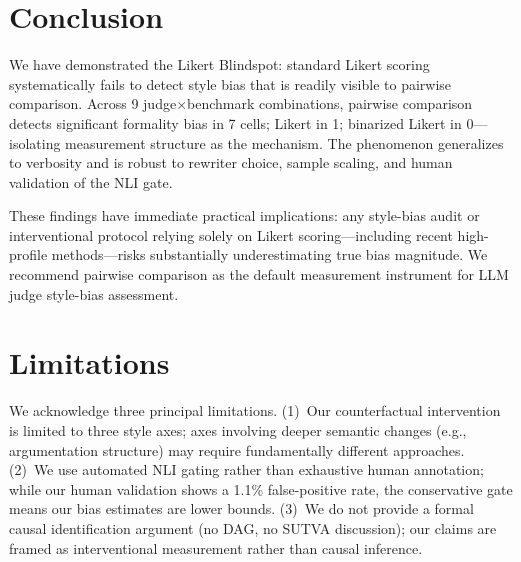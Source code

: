 \documentclass[11pt]{article}
\begin{document}
\section{Conclusion}

We have demonstrated the Likert Blindspot: standard Likert scoring systematically fails to detect style bias that is readily visible to pairwise comparison.
Across 9 judge$\times$benchmark combinations, pairwise comparison detects significant formality bias in 7 cells; Likert in 1; binarized Likert in 0---isolating measurement structure as the mechanism.
The phenomenon generalizes to verbosity and is robust to rewriter choice, sample scaling, and human validation of the NLI gate.

These findings have immediate practical implications: any style-bias audit or interventional protocol relying solely on Likert scoring---including recent high-profile methods---risks substantially underestimating true bias magnitude.
We recommend pairwise comparison as the default measurement instrument for LLM judge style-bias assessment.

\section*{Limitations}
We acknowledge three principal limitations. (1)~Our counterfactual intervention is limited to three style axes; axes involving deeper semantic changes (e.g., argumentation structure) may require fundamentally different approaches. (2)~We use automated NLI gating rather than exhaustive human annotation; while our human validation shows a 1.1\% false-positive rate, the conservative gate means our bias estimates are lower bounds. (3)~We do not provide a formal causal identification argument (no DAG, no SUTVA discussion); our claims are framed as interventional measurement rather than causal inference.
\end{document}
